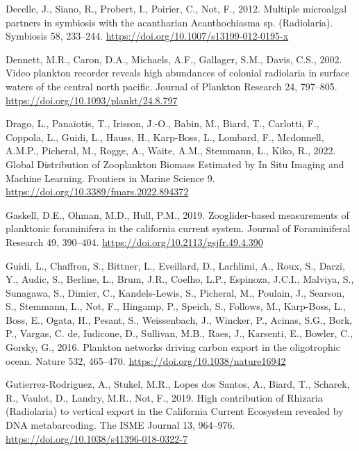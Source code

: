 \documentclass[
]{article}
\newlength{\cslhangindent}
\newlength{\cslentryspacingunit} %
\newenvironment{CSLReferences}[2] %
 {%
  \setlength{\parindent}{0pt}
  \ifodd #1
  \let\oldpar\par
  \def\par{\hangindent=\cslhangindent\oldpar}
  \fi
  \setlength{\parskip}{#2\cslentryspacingunit}
 }%
 {}
\begin{document}
\begin{CSLReferences}{1}{0}
\leavevmode{}%
Decelle, J., Siano, R., Probert, I., Poirier, C., Not, F., 2012.
Multiple microalgal partners in symbiosis with the acantharian
Acanthochiasma sp. (Radiolaria). Symbiosis 58, 233--244.
\url{https://doi.org/10.1007/s13199-012-0195-x}

\leavevmode{}%
Dennett, M.R., Caron, D.A., Michaels, A.F., Gallager, S.M., Davis, C.S.,
2002. Video plankton recorder reveals high abundances of colonial
radiolaria in surface waters of the central north pacific. Journal of
Plankton Research 24, 797--805.
\url{https://doi.org/10.1093/plankt/24.8.797}

\leavevmode{}%
Drago, L., Panaïotis, T., Irisson, J.-O., Babin, M., Biard, T.,
Carlotti, F., Coppola, L., Guidi, L., Hauss, H., Karp-Boss, L., Lombard,
F., Mcdonnell, A.M.P., Picheral, M., Rogge, A., Waite, A.M., Stemmann,
L., Kiko, R., 2022. Global Distribution of Zooplankton Biomass Estimated
by In Situ Imaging and Machine Learning. Frontiers in Marine Science 9.
\url{https://doi.org/10.3389/fmars.2022.894372}

\leavevmode{}%
Gaskell, D.E., Ohman, M.D., Hull, P.M., 2019. Zooglider-based
measurements of planktonic foraminifera in the california current
system. Journal of Foraminiferal Research 49, 390--404.
\url{https://doi.org/10.2113/gsjfr.49.4.390}

\leavevmode{}%
Guidi, L., Chaffron, S., Bittner, L., Eveillard, D., Larhlimi, A., Roux,
S., Darzi, Y., Audic, S., Berline, L., Brum, J.R., Coelho, L.P.,
Espinoza, J.C.I., Malviya, S., Sunagawa, S., Dimier, C., Kandels-Lewis,
S., Picheral, M., Poulain, J., Searson, S., Stemmann, L., Not, F.,
Hingamp, P., Speich, S., Follows, M., Karp-Boss, L., Boss, E., Ogata,
H., Pesant, S., Weissenbach, J., Wincker, P., Acinas, S.G., Bork, P.,
Vargas, C. de, Iudicone, D., Sullivan, M.B., Raes, J., Karsenti, E.,
Bowler, C., Gorsky, G., 2016. Plankton networks driving carbon export in
the oligotrophic ocean. Nature 532, 465--470.
\url{https://doi.org/10.1038/nature16942}

\leavevmode{}%
Gutierrez-Rodriguez, A., Stukel, M.R., Lopes dos Santos, A., Biard, T.,
Scharek, R., Vaulot, D., Landry, M.R., Not, F., 2019. High contribution
of Rhizaria (Radiolaria) to vertical export in the California Current
Ecosystem revealed by DNA metabarcoding. The ISME Journal 13, 964--976.
\url{https://doi.org/10.1038/s41396-018-0322-7}


\end{CSLReferences}
\end{document}
